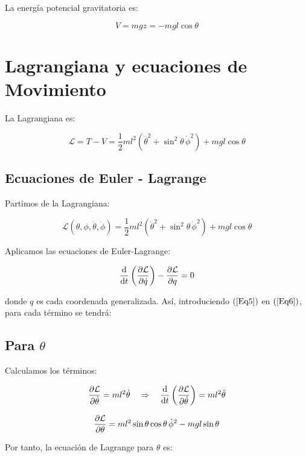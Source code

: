 \documentclass[12pt]{article}
\begin{document}
La energía potencial gravitatoria es:

\begin{equation}
V = m g z = -m g l \cos\theta
\end{equation}
\label{Eq4}

\section*{Lagrangiana y ecuaciones de Movimiento}

La Lagrangiana es:

\begin{equation}
\mathcal{L} = T - V = \frac{1}{2} m l^2 \left( \dot{\theta}^2 + \sin^2\theta \, \dot{\phi}^2 \right) + m g l \cos\theta
\label{Eq5}
\end{equation}


\subsection*{Ecuaciones de Euler - Lagrange}

Partimos de la Lagrangiana:

\[
\mathcal{L}(\theta, \phi, \dot{\theta}, \dot{\phi}) = \frac{1}{2} m l^2 \left( \dot{\theta}^2 + \sin^2\theta \, \dot{\phi}^2 \right) + m g l \cos\theta
\]

Aplicamos las ecuaciones de Euler-Lagrange:

\begin{equation}
\dv{t} \left( \pdv{\mathcal{L}}{\dot{q}} \right) - \pdv{\mathcal{L}}{q} = 0
\label{Eq6}
\end{equation}


donde \( q \) es cada coordenada generalizada. Así, introduciendo \((\ref{Eq5})\) en \((\ref{Eq6})\), para cada término se tendrá:

\subsection*{Para \( \theta \)}

Calculamos los términos:

\[
\pdv{\mathcal{L}}{\dot{\theta}} = m l^2 \dot{\theta}
\quad \Rightarrow \quad
\dv{t} \left( \pdv{\mathcal{L}}{\dot{\theta}} \right) = m l^2 \ddot{\theta}
\]

\[
\pdv{\mathcal{L}}{\theta} = m l^2 \sin\theta \cos\theta \, \dot{\phi}^2 - m g l \sin\theta
\]

Por tanto, la ecuación de Lagrange para \( \theta \) es:
\end{document}
